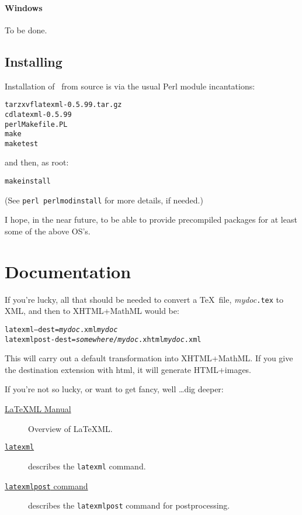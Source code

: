 \documentclass{article}
\newcommand{\current}{0.5.99}
\begin{document}
\paragraph{Windows}
To be done.

\subsection{Installing}
Installation of \LaTeXML\ from source is via the usual Perl module incantations:
\begin{alltt}
   tar zxvf latexml-\current.tar.gz
   cd latexml-\current\\
   perl Makefile.PL
   make
   make test
\end{alltt}
and then, as root:
\begin{alltt}
   make install
\end{alltt}
(See \texttt{perl perlmodinstall} for more details, if needed.)

I hope, in the near future, to be able to provide precompiled packages
for at least some of the above OS's.

\section{Documentation}\label{docs}
If you're lucky, all that should be needed to convert
a \TeX\ file, \textit{mydoc}\texttt{.tex} to XML, and
then to XHTML+MathML would be:
\begin{alltt}
   latexml --dest=\textit{mydoc}.xml \textit{mydoc}
   latexmlpost -dest=\textit{somewhere/mydoc}.xhtml \textit{mydoc}.xml
\end{alltt}
This will carry out a default transformation into XHTML+MathML.  If you
give the destination extension with html, it will generate HTML+images.

If you're not so lucky, or want to get fancy, well \ldots dig deeper:
\begin{description}
\item[\href{manual/index.xhtml}{LaTeXML Manual}]
    Overview of LaTeXML.
\item[\href{manual/commands/latexml.xhtml}{\texttt{latexml}}]
    describes the \texttt{latexml} command.
\item[\href{manual/commands/latexmlpost.xhtml}{\texttt{latexmlpost} command}]
   describes the \texttt{latexmlpost} command for postprocessing.
\end{description}
\end{document}
